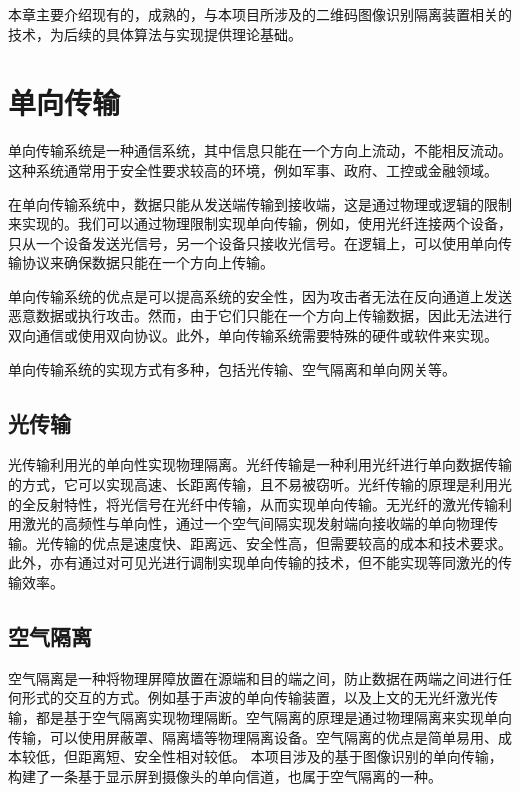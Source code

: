 \label{chap:tech} 

本章主要介绍现有的，成熟的，与本项目所涉及的二维码图像识别隔离装置相关的技术，为后续的具体算法与实现提供理论基础。

\section{单向传输}

单向传输系统是一种通信系统，其中信息只能在一个方向上流动，不能相反流动。这种系统通常用于安全性要求较高的环境，例如军事、政府、工控或金融领域。

在单向传输系统中，数据只能从发送端传输到接收端，这是通过物理或逻辑的限制来实现的。我们可以通过物理限制实现单向传输，例如，使用光纤连接两个设备，只从一个设备发送光信号，另一个设备只接收光信号。在逻辑上，可以使用单向传输协议来确保数据只能在一个方向上传输。

单向传输系统的优点是可以提高系统的安全性，因为攻击者无法在反向通道上发送恶意数据或执行攻击。然而，由于它们只能在一个方向上传输数据，因此无法进行双向通信或使用双向协议。此外，单向传输系统需要特殊的硬件或软件来实现\cite{karadaug2009secure}。

单向传输系统的实现方式有多种，包括光传输、空气隔离和单向网关等。

\subsection{光传输}

光传输利用光的单向性实现物理隔离。光纤传输是一种利用光纤进行单向数据传输的方式，它可以实现高速、长距离传输，且不易被窃听。光纤传输的原理是利用光的全反射特性，将光信号在光纤中传输，从而实现单向传输。无光纤的激光传输利用激光的高频性与单向性，通过一个空气间隔实现发射端向接收端的单向物理传输。光传输的优点是速度快、距离远、安全性高，但需要较高的成本和技术要求。此外，亦有通过对可见光进行调制实现单向传输的技术，但不能实现等同激光的传输效率。

\subsection{空气隔离}

空气隔离是一种将物理屏障放置在源端和目的端之间，防止数据在两端之间进行任何形式的交互的方式\cite{bostanunidirectional}。例如基于声波的单向传输装置，以及上文的无光纤激光传输，都是基于空气隔离实现物理隔断。空气隔离的原理是通过物理隔离来实现单向传输，可以使用屏蔽罩、隔离墙等物理隔离设备。空气隔离的优点是简单易用、成本较低，但距离短、安全性相对较低。
本项目涉及的基于图像识别的单向传输，构建了一条基于显示屏到摄像头的单向信道，也属于空气隔离的一种。

